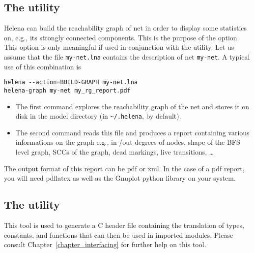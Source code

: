 \subsection{The  utility}
\label{sec:helena-graph}
Helena can build the reachability graph of net in order to display
some statistics on, e.g., its strongly connected components.  This is
the purpose of the  option.  This option
is only meaningful if used in conjunction with the
 utility.  Let us assume that the file
\texttt{my-net.lna} contains the description of net \texttt{my-net}.
A typical use of this combination is
\begin{verbatim}
helena --action=BUILD-GRAPH my-net.lna
helena-graph my-net my_rg_report.pdf
\end{verbatim}
\begin{itemize}
\item The first command explores the reachability graph of the net and
  stores it on disk in the model directory (in \texttt{\~{}/.helena},
  by default).
\item The second command reads this file and produces a report
  containing various informations on the graph e.g., in-/out-degrees
  of nodes, shape of the BFS level graph, SCCs of the graph, dead
  markings, live transitions, \ldots
\end{itemize}
The output format of this report can be pdf or xml.  In the case of a
pdf report, you will need pdflatex as well as the Gnuplot python
library on your system.
\subsection{The  utility}
This tool is used to generate a C header file containing the
translation of types, constants, and functions that can then be used
in imported modules.  Please consult Chapter~\ref{chapter_interfacing}
for further help on this tool.
